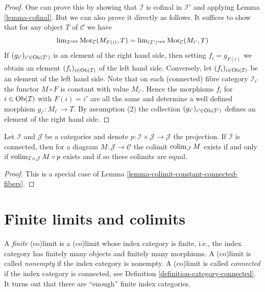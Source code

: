 \begin{proof}
One can prove this by showing that $\mathcal{I}$ is cofinal in
$\mathcal{I}'$ and applying Lemma \ref{lemma-cofinal}.
But we can also prove it directly as follows.
It suffices to show that for any object $T$ of $\mathcal{C}$ we have
$$
\mathop{\mathrm{lim}}\nolimits_{\mathcal{I}^{opp}} \mathop{\mathrm{Mor}}\nolimits_\mathcal{C}(M_{F(i)}, T)
=
\mathop{\mathrm{lim}}\nolimits_{(\mathcal{I}')^{opp}} \mathop{\mathrm{Mor}}\nolimits_\mathcal{C}(M_{i'}, T)
$$
If $(g_{i'})_{i' \in \mathop{\mathrm{Ob}}\nolimits(\mathcal{I}')}$ is an element of
the right hand side, then setting $f_i = g_{F(i)}$ we obtain an
element $(f_i)_{i \in \mathop{\mathrm{Ob}}\nolimits(\mathcal{I})}$ of the left hand side.
Conversely, let $(f_i)_{i \in \mathop{\mathrm{Ob}}\nolimits(\mathcal{I})}$ be an element of the
left hand side. Note that on each (connected)
fibre category $\mathcal{I}_{i'}$ the functor $M \circ F$
is constant with value $M_{i'}$. Hence the morphisms
$f_i$ for $i \in \mathop{\mathrm{Ob}}\nolimits(\mathcal{I})$ with $F(i) = i'$
are all the same and determine a well defined morphism
$g_{i'} : M_{i'} \to T$. By assumption (2) the collection
$(g_{i'})_{i' \in \mathop{\mathrm{Ob}}\nolimits(\mathcal{I}')}$ defines an element
of the right hand side.
\end{proof}

\begin{lemma}
\label{lemma-product-with-connected}
Let $\mathcal{I}$ and $\mathcal{J}$ be a categories and denote
$p : \mathcal{I} \times \mathcal{J} \to \mathcal{J}$ the projection.
If $\mathcal{I}$ is connected, then for a diagram
$M : \mathcal{J} \to \mathcal{C}$ the colimit $\mathop{\mathrm{colim}}\nolimits_\mathcal{J} M$ exists
if and only if $\mathop{\mathrm{colim}}\nolimits_{\mathcal{I} \times \mathcal{J}} M \circ p$ exists and
if so these colimits are equal.
\end{lemma}

\begin{proof}
This is a special case of Lemma \ref{lemma-colimit-constant-connected-fibers}.
\end{proof}






\section{Finite limits and colimits}
\label{section-finite-limits}

\noindent
A {\it finite} (co)limit is a (co)limit whose index category is finite,
i.e., the index category has finitely many objects and finitely many
morphisms. A (co)limit is called {\it nonempty} if the index category is
nonempty. A (co)limit is called {\it connected} if the index category is
connected, see
Definition \ref{definition-category-connected}.
It turns out that there are ``enough'' finite index categories.

